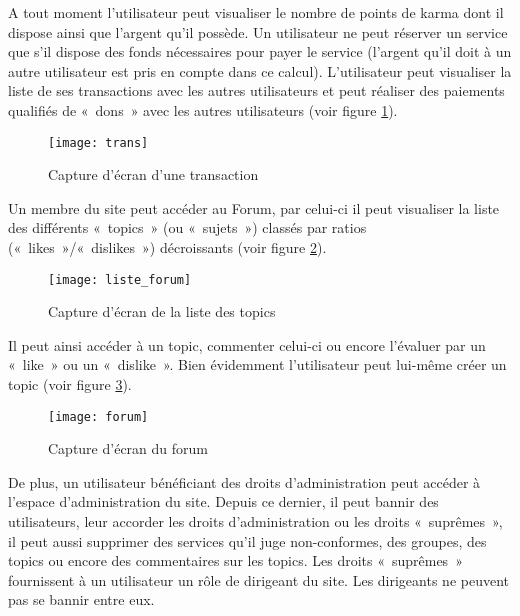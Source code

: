 A tout moment l'utilisateur peut visualiser le nombre de points de karma dont il dispose ainsi que l'argent qu'il possède.
Un utilisateur ne peut réserver un service que s'il dispose des fonds nécessaires pour payer le service (l'argent qu'il doit à un autre utilisateur est pris en compte dans ce calcul).
L'utilisateur peut visualiser la liste de ses transactions avec les autres utilisateurs et peut réaliser des paiements qualifiés de «~dons~» avec les autres utilisateurs (voir figure \ref{fig:Transaction}).

\begin{figure}[h!]
\centering
\texttt{[image: trans]}
\caption{Capture d'écran d'une transaction}
\label{fig:Transaction}
\end{figure}

Un membre du site peut accéder au Forum, par celui-ci il peut visualiser la liste des différents «~topics~» (ou «~sujets~») classés par ratios («~likes~»/«~dislikes~») décroissants (voir figure \ref{fig:Liste_Forum}).

\begin{figure}[h!]
\centering
\texttt{[image: liste\_forum]}
\caption{Capture d'écran de la liste des topics}
\label{fig:Liste_Forum}
\end{figure}

Il peut ainsi accéder à un topic, commenter celui-ci ou encore l'évaluer par un «~like~» ou un «~dislike~». 
Bien évidemment l'utilisateur peut lui-même créer un topic (voir figure \ref{fig:Forum}).

\begin{figure}[h!]
\centering
\texttt{[image: forum]}
\caption{Capture d'écran du forum}
\label{fig:Forum}
\end{figure}

De plus, un utilisateur bénéficiant des droits d'administration peut accéder à l'espace d'administration du site.
Depuis ce dernier, il peut bannir des utilisateurs, leur accorder les droits d'administration ou les droits «~suprêmes~», il peut aussi supprimer des services qu'il juge non-conformes, des groupes, des topics ou encore des commentaires sur les topics. Les droits «~suprêmes~» fournissent à un utilisateur un rôle de dirigeant du site. Les dirigeants ne peuvent pas se bannir entre eux.

